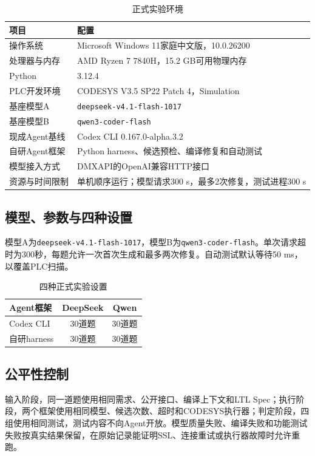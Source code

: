 \documentclass[UTF8,a4paper,zihao=-4]{ctexart}
\begin{document}
\begin{table}[H]
  \centering
  \caption{正式实验环境}
  \label{tab:environment}
  \begin{tabularx}{\textwidth}{L{3.3cm}X}
    \toprule
    项目 & 配置\\
    \midrule
    操作系统 & Microsoft Windows 11家庭中文版，10.0.26200\\
    处理器与内存 & AMD Ryzen 7 7840H，15.2 GB可用物理内存\\
    Python & 3.12.4\\
    PLC开发环境 & CODESYS V3.5 SP22 Patch 4，Simulation\\
    基座模型A & \texttt{deepseek-v4.1-flash-1017}\\
    基座模型B & \texttt{qwen3-coder-flash}\\
    现成Agent基线 & Codex CLI 0.167.0-alpha.3.2\\
    自研Agent框架 & Python harness、候选预检、编译修复和自动测试\\
    模型接入方式 & DMXAPI的OpenAI兼容HTTP接口\\
    资源与时间限制 & 单机顺序运行；模型请求300 s，最多2次修复，测试进程300 s\\
    \bottomrule
  \end{tabularx}
\end{table}

\subsection{模型、参数与四种设置}
模型A为\texttt{deepseek-v4.1-flash-1017}，模型B为\texttt{qwen3-coder-flash}。单次请求超时为300秒，每题允许一次首次生成和最多两次修复。自动测试默认等待50 ms，以覆盖PLC扫描。

\begin{table}[H]
  \centering
  \caption{四种正式实验设置}
  \begin{tabular}{lcc}
    \toprule
    Agent框架 & DeepSeek & Qwen\\
    \midrule
    Codex CLI & 30道题 & 30道题\\
    自研harness & 30道题 & 30道题\\
    \bottomrule
  \end{tabular}
\end{table}

\subsection{公平性控制}
输入阶段，同一道题使用相同需求、公开接口、编译上下文和LTL Spec；执行阶段，两个框架使用相同模型、候选次数、超时和CODESYS执行器；判定阶段，四组使用相同测试，测试内容不向Agent开放。模型质量失败、编译失败和功能测试失败按真实结果保留，在原始记录能证明SSL、连接重试或执行器故障时允许重跑。
\end{document}
